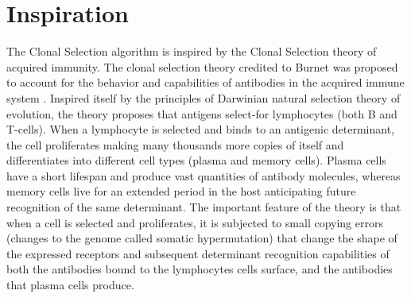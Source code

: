 \documentclass[a4paper, 11pt]{article}
\begin{document}
\section{Inspiration}
\label{sec:inspiration}
The Clonal Selection algorithm is inspired by the Clonal Selection theory of acquired immunity.
The clonal selection theory credited to Burnet was proposed to account for the behavior and capabilities of antibodies in the acquired immune system \cite{Burnet1957, Burnet1959}. Inspired itself by the principles of Darwinian natural selection theory of evolution, the theory proposes that antigens select-for lymphocytes (both B and T-cells). When a lymphocyte is selected and binds to an antigenic determinant, the cell proliferates making many thousands more copies of itself and differentiates into different cell types (plasma and memory cells). Plasma cells have a short lifespan and produce vast quantities of antibody molecules, whereas memory cells live for an extended period in the host anticipating future recognition of the same determinant. The important feature of the theory is that when a cell is selected and proliferates, it is subjected to small copying errors (changes to the genome called somatic hypermutation) that change the shape of the expressed receptors and subsequent determinant recognition capabilities of both the antibodies bound to the lymphocytes cells surface, and the antibodies that plasma cells produce.

\end{document}
